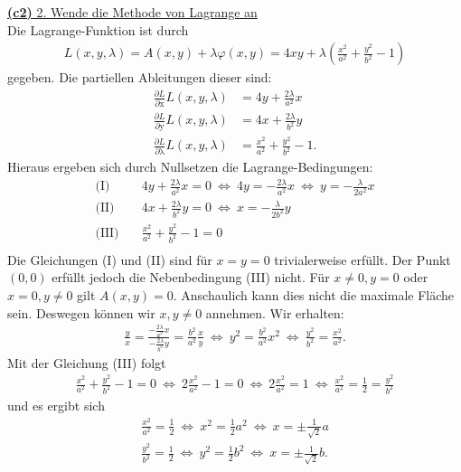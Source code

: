 \underline{\textbf{(c2)} 2. Wende die Methode von Lagrange an}\\
Die Lagrange-Funktion ist durch
\begin{align*}
	L(x,y,\lambda) 
	= A(x,y) + \lambda\varphi(x,y)
	= 4xy + \lambda \left(\frac{x^2}{a^2} + \frac{y^2}{b^2} - 1\right)
\end{align*}
gegeben. Die partiellen Ableitungen dieser sind:
\begin{align*}
	\frac{\partial L}{\partial \mathrm{x}}L(x,y,\lambda)
	&= 4 y + \frac{2\lambda}{a^2} x \\
	\frac{\partial L}{\partial \mathrm{y}}L(x,y,\lambda)
	&= 4 x + \frac{2\lambda}{b^2} y \\
	\frac{\partial L}{\partial \mathrm{\lambda}}L(x,y,\lambda)
	&= \frac{x^2}{a^2} + \frac{y^2}{b^2} - 1.
\end{align*}
Hieraus ergeben sich durch Nullsetzen die Lagrange-Bedingungen:
\begin{align*}
	\textrm{(I)}& \quad 
	4 y + \frac{2\lambda}{a^2} x = 0
	\ \Leftrightarrow \ 4y = - \frac{2\lambda}{a^2} x 
	\ \Leftrightarrow \ y = -\frac{\lambda}{2a^2} x
	\\
	\textrm{(II)}& \quad 
	4 x + \frac{2\lambda}{b^2} y = 0
	\ \Leftrightarrow \
	x = - \frac{\lambda}{2 b^2} y 
	\\
	\textrm{(III)}& \quad 
	\frac{x^2}{a^2} + \frac{y^2}{b^2} - 1 = 0\\
\end{align*}
Die Gleichungen (I) und (II) sind für $ x = y = 0 $ trivialerweise erfüllt.
Der Punkt $ (0,0)  $ erfüllt jedoch die Nebenbedingung (III) nicht.
Für $ x \neq 0, y = 0$ oder $ x = 0, y \neq 0 $ gilt $ A(x,y) = 0 $.
Anschaulich kann dies nicht die maximale Fläche sein. Deswegen können wir $ x,y \neq 0 $ annehmen. Wir erhalten:
\begin{align*}
	\frac{y}{x} = \frac{-\frac{2 \lambda}{a^2} x}{- \frac{2\lambda}{b^2} y}
	= 
	\frac{b^2}{a^2} \frac{x}{y}
	\
	\Leftrightarrow \
	y^2 = \frac{b^2}{a^2} x^2
	\ \Leftrightarrow \
	\frac{y^2}{b^2} = \frac{x^2}{a^2}.
\end{align*}
Mit der Gleichung (III) folgt
\begin{align*}
	\frac{x^2}{a^2} + \frac{y^2}{b^2} - 1 = 0
	\ \Leftrightarrow \
	2 \frac{x^2}{a^2}  -1 = 0
	\ \Leftrightarrow \
	2 \frac{x^2}{a^2}   = 1
	\ \Leftrightarrow \
	\frac{x^2}{a^2} = \frac{1}{2} = \frac{y^2}{b^2}
\end{align*}
und es ergibt sich 
\begin{align*}
	\frac{x^2}{a^2} = \frac{1}{2} 
	 \ \Leftrightarrow \ 
	 x^2  = \frac{1}{2} a^2
	 \ \Leftrightarrow \
	 x = \pm \frac{1}{\sqrt{2}} a\\
	 \frac{y^2}{b^2} = \frac{1}{2} 
	 \ \Leftrightarrow \ 
	 y^2  = \frac{1}{2} b^2
	 \ \Leftrightarrow \
	 x = \pm \frac{1}{\sqrt{2}} b.
\end{align*}

